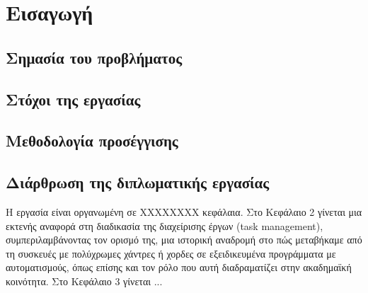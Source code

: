 \chapter{Εισαγωγή}


	\section{Σημασία του προβλήματος}

	\section{Στόχοι της εργασίας}

	\section{Μεθοδολογία προσέγγισης}

	\section{Διάρθρωση της διπλωματικής εργασίας}
            Η εργασία είναι οργανωμένη σε ΧΧΧΧΧΧΧΧ κεφάλαια. Στο Κεφάλαιο 2 γίνεται μια εκτενής αναφορά στη διαδικασία της διαχείρισης έργων (task management), συμπεριλαμβάνοντας τον ορισμό της, μια ιστορική αναδρομή στο πώς μεταβήκαμε από τη συσκευές με πολύχρωμες χάντρες ή χορδες σε εξειδικευμένα προγράμματα με αυτοματισμούς, όπως επίσης και τον ρόλο που αυτή διαδραματίζει στην ακαδημαϊκή κοινότητα.
            Στο Κεφάλαιο 3 γίνεται ...